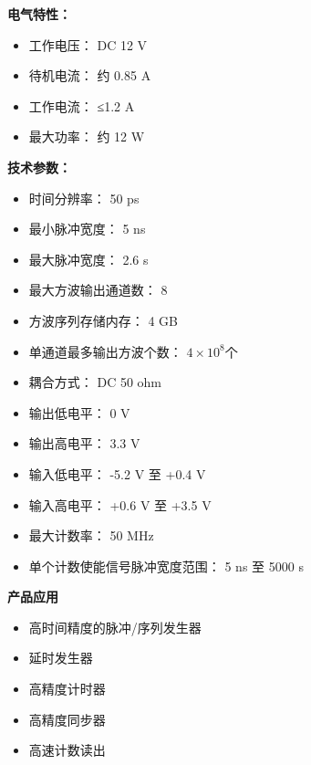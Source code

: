 \vspace{0.4cm}
\noindent\xiaosi\textbf{电气特性：}
\vspace{0.4cm}
\song
\begin{itemize}
 \item 工作电压： DC 12 V
 \item 待机电流： 约 0.85 A
 \item 工作电流： ≤1.2 A
 \item 最大功率： 约 12 W
\end{itemize}

\vspace{0.4cm}
\noindent\xiaosi\textbf{技术参数：}
\vspace{0.4cm}
\song
\begin{itemize}
 \item  时间分辨率： 50 ps
 \item 最小脉冲宽度： 5 ns
 \item 最大脉冲宽度： 2.6 s
 \item 最大方波输出通道数： 8
 \item  方波序列存储内存： 4 GB
 \item  单通道最多输出方波个数： $4\times 10^8$个
 \item  耦合方式： DC 50 ohm
 \item  输出低电平： 0 V
 \item  输出高电平： 3.3 V
 \item  输入低电平： -5.2 V 至 +0.4 V
 \item  输入高电平： +0.6 V 至 +3.5 V
 \item  最大计数率： 50 MHz
 \item  单个计数使能信号脉冲宽度范围： 5 ns 至 5000 s
\end{itemize}

\vspace{1cm}
\noindent\sanhao\textbf{产品应用}
\vspace{0.6cm}
\song
\begin{itemize}
 \item 高时间精度的脉冲/序列发生器
 \item 延时发生器
 \item 高精度计时器
 \item 高精度同步器
 \item 高速计数读出
\end{itemize}
